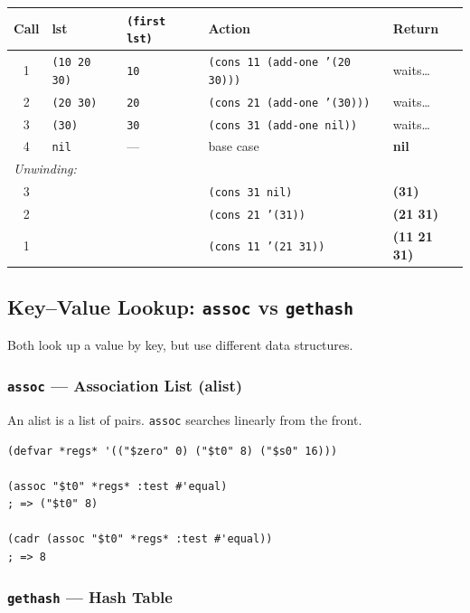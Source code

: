 \begin{center}
\begin{tabular}{cllll}
  \toprule
  \textbf{Call} & \textbf{lst} & \texttt{(first lst)} &
  \textbf{Action} & \textbf{Return} \\
  \midrule
  1 & \texttt{(10 20 30)} & \texttt{10} &
    \texttt{(cons 11 (add-one '(20 30)))} & waits\ldots \\
  2 & \texttt{(20 30)} & \texttt{20} &
    \texttt{(cons 21 (add-one '(30)))} & waits\ldots \\
  3 & \texttt{(30)} & \texttt{30} &
    \texttt{(cons 31 (add-one nil))} & waits\ldots \\
  4 & \texttt{nil} & --- &
    base case & \textbf{nil} \\
  \midrule
  \multicolumn{5}{l}{\textit{Unwinding:}} \\
  \midrule
  3 & & & \texttt{(cons 31 nil)} & \textbf{(31)} \\
  2 & & & \texttt{(cons 21 '(31))} & \textbf{(21 31)} \\
  1 & & & \texttt{(cons 11 '(21 31))} & \textbf{(11 21 31)} \\
  \bottomrule
\end{tabular}
\end{center}

\subsection{Key--Value Lookup: \texttt{assoc} vs \texttt{gethash}}

Both look up a value by key, but use different data structures.

\subsubsection{\texttt{assoc} --- Association List (alist)}

An alist is a list of pairs. \texttt{assoc} searches linearly from the
front.

\begin{lstlisting}
(defvar *regs* '(("$zero" 0) ("$t0" 8) ("$s0" 16)))

(assoc "$t0" *regs* :test #'equal)
; => ("$t0" 8)

(cadr (assoc "$t0" *regs* :test #'equal))
; => 8
\end{lstlisting}

\subsubsection{\texttt{gethash} --- Hash Table}

